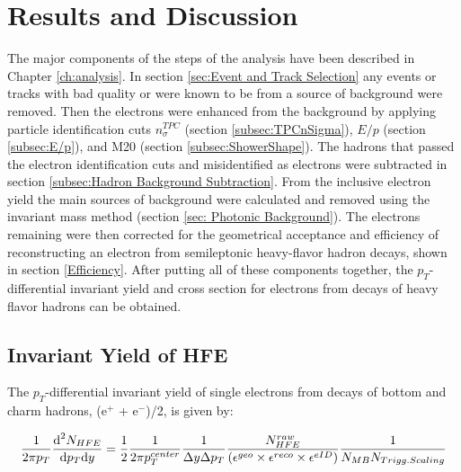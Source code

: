 \chapter{Results and Discussion} \label{ch:results and discussion}

The major components of the steps of the analysis have been described in Chapter \ref{ch:analysis}. In section \ref{sec:Event and Track Selection} any events or tracks with bad quality or were known to be from a source of background were removed. Then the electrons were enhanced from the background by applying particle identification cuts $n^{TPC}_{\sigma}$ (section \ref{subsec:TPCnSigma}), $E/p$ (section \ref{subsec:E/p}), and M20 (section \ref{subsec:ShowerShape}). The hadrons that passed the electron identification cuts and misidentified as electrons were subtracted in section \ref{subsec:Hadron Background Subtraction}. From the inclusive electron yield the main sources of background were calculated and removed using the invariant mass method (section \ref{sec: Photonic Background}). The electrons remaining were then corrected for the geometrical acceptance and efficiency of reconstructing an electron from semileptonic heavy-flavor hadron decays, shown in section \ref{Efficiency}. After putting all of these components together, the $p_{T}$-differential invariant yield and cross section for electrons from decays of heavy flavor hadrons can be obtained.

\section{Invariant Yield of HFE}


The $p_{T}$-differential invariant yield of single electrons from decays of bottom and charm hadrons, (e$^{+}$ + e$^{-}$)/2, is given by:

\begin{equation}\label{eqn:Inv Yield}
\frac{1}{2 \pi p_{T}} \frac{\textnormal{d}^{2} N_{HFE}}{\textnormal{d}p_{T}\textnormal{d}y} = \frac{1}{2} \frac{1}{2 \pi p^{center}_{T}} \frac{1}{\Delta y \Delta p_{T}} \frac{N^{raw}_{HFE}}{(\epsilon^{geo} \times \epsilon^{reco} \times \epsilon^{eID})} \frac{1}{N_{MB} N_{Trigg.Scaling}}
\end{equation}

